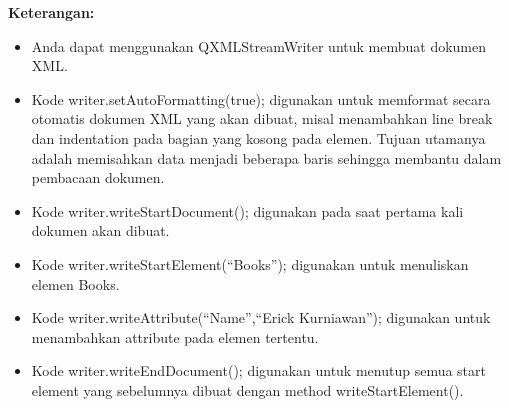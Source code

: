 \textbf{Keterangan:}

\begin{itemize}

\item
  Anda dapat menggunakan QXMLStreamWriter untuk membuat dokumen XML.
\item
  Kode writer.setAutoFormatting(true); digunakan untuk memformat secara
  otomatis dokumen XML yang akan dibuat, misal menambahkan line break
  dan indentation pada bagian yang kosong pada elemen. Tujuan utamanya
  adalah memisahkan data menjadi beberapa baris sehingga membantu dalam
  pembacaan dokumen.
\item
  Kode writer.writeStartDocument(); digunakan pada saat pertama kali
  dokumen akan dibuat.
\item
  Kode writer.writeStartElement(``Books''); digunakan untuk menuliskan
  elemen Books.
\item
  Kode writer.writeAttribute(``Name'',``Erick Kurniawan''); digunakan
  untuk menambahkan attribute pada elemen tertentu.
\item
  Kode writer.writeEndDocument(); digunakan untuk menutup semua start
  element yang sebelumnya dibuat dengan method writeStartElement().
\end{itemize}
